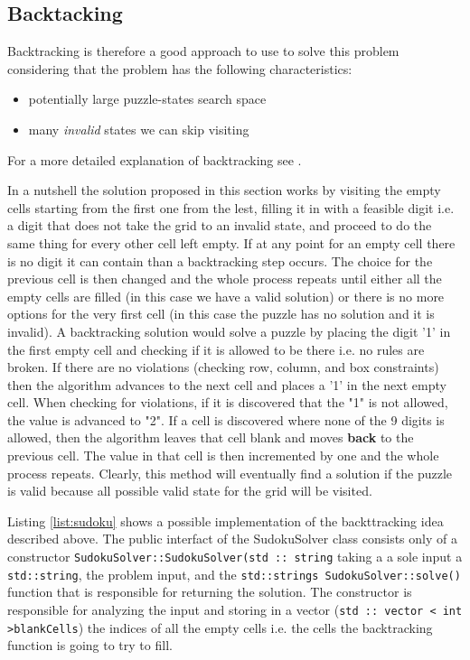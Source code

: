 \subsection{Backtacking}
\label{sudoku:sec:bruteforce}

Backtracking is therefore a good approach to use to solve this problem considering that the problem
has the following characteristics:
\begin{itemize}
	\item potentially large puzzle-states search space
	\item many \textit{invalid} states we can skip visiting
\end{itemize}
For a more detailed explanation of backtracking see \cite{backtracking}.

In a nutshell the solution proposed in this section works by visiting the empty cells starting from
the first one from the lest, filling it in with a feasible digit i.e. a digit that does not take the
grid to an invalid state, and proceed to do the same thing for every other cell left empty. If at
any point for an empty cell there is no digit it can contain than a backtracking step occurs. The
choice for the previous cell is then changed and the whole process repeats until either all the
empty cells are filled (in this case we have a valid solution) or there is no more options for the
very first cell (in this case the puzzle has no solution and it is invalid). A backtracking solution
would solve a puzzle by placing the digit '1' in the first empty cell and checking if it is allowed
to be there i.e. no rules are broken. If there are no violations (checking row, column, and box
constraints) then the algorithm advances to the next cell and places a '1' in the next empty cell.
When checking for violations, if it is discovered that the "1" is not allowed, the value is advanced
to "2". If a cell is discovered where none of the 9 digits is allowed, then the algorithm leaves
that cell blank and moves \textbf{back} to the previous cell. The value in that cell is then
incremented by one and the whole process repeats. Clearly, this method will eventually find a
solution if the puzzle is valid because all possible valid state for the grid will be visited. 


Listing \ref{list:sudoku} shows a possible implementation of the backttracking idea described above.
The public interfact of the SudokuSolver class consists only of a constructor
\lstinline[columns=fixed]{SudokuSolver::SudokuSolver(std :: string} taking a a sole input a
\lstinline[columns=fixed]{std::string}, the problem input, and the
\lstinline[columns=fixed]{std::strings SudokuSolver::solve()} function that is responsible for
returning the solution. The constructor is responsible for analyzing the input and storing in a
vector (\lstinline[columns=fixed]{std :: vector < int >blankCells}) the indices of all the empty
cells i.e. the cells the backtracking function is going to try to fill.


